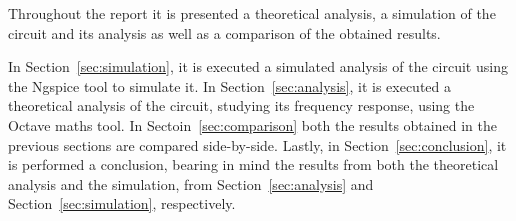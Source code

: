 \par Throughout the report it is presented a theoretical analysis, a simulation of the
circuit and its analysis as well as a comparison of the obtained results.

\par In Section~\ref{sec:simulation}, it is executed a simulated analysis of the circuit using
the Ngspice tool to simulate it.
In Section~\ref{sec:analysis}, it is executed a theoretical analysis of the circuit, studying its frequency response, using the Octave maths tool.
In Sectoin~\ref{sec:comparison} both the results obtained in the previous sections are compared side-by-side.
Lastly, in Section~\ref{sec:conclusion}, it is performed a conclusion, bearing in mind the
results from both the theoretical analysis and the simulation, from Section~\ref{sec:analysis}
and Section~\ref{sec:simulation}, respectively.




\newpage
